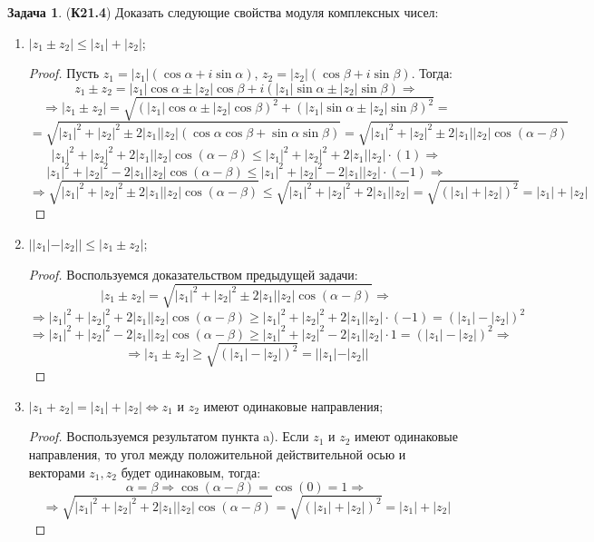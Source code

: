 \documentclass[12pt]{article}
\theoremstyle{definition}
\newtheorem{problem}{Задача}
\begin{document}
\begin{problem}(\textbf{К21.4}) Доказать следующие свойства модуля комплексных чисел:
	\begin{enumerate}[label=\asbuk*)]
		\item $|z_1 \pm z_2| \leq |z_1| + |z_2|$;
		\begin{proof}
			Пусть $z_1 = |z_1|(\cos\alpha + i \sin\alpha)$, $z_2 = |z_2|(\cos\beta + i \sin \beta)$. Тогда:
			$$
				z_1 \pm z_2 = |z_1|\cos\alpha \pm |z_2|\cos\beta + i(|z_1|\sin\alpha \pm |z_2|\sin\beta) \Rightarrow
			$$
			$$
				\Rightarrow |z_1 \pm z_2| = \sqrt{(|z_1|\cos\alpha \pm |z_2|\cos\beta)^2 + (|z_1|\sin\alpha \pm |z_2|\sin\beta)^2} = 
			$$
			$$
				=	\sqrt{|z_1|^2 + |z_2|^2 \pm 2|z_1||z_2|(\cos\alpha\cos\beta + \sin\alpha\sin\beta) } = \sqrt{|z_1|^2 + |z_2|^2 \pm 2|z_1||z_2|\cos(\alpha - \beta)}
			$$
			$$
				|z_1|^2 + |z_2|^2 + 2|z_1||z_2|\cos(\alpha - \beta) \leq  |z_1|^2 + |z_2|^2 + 2|z_1||z_2|{\cdot}(1) \Rightarrow 
			$$
			$$
				|z_1|^2 + |z_2|^2 - 2|z_1||z_2|\cos(\alpha - \beta) \leq  |z_1|^2 + |z_2|^2 - 2|z_1||z_2|{\cdot}(-1) \Rightarrow
			$$
			$$
				\Rightarrow \sqrt{|z_1|^2 + |z_2|^2 \pm 2|z_1||z_2|\cos(\alpha - \beta)} \leq \sqrt{|z_1|^2 + |z_2|^2 + 2|z_1||z_2|} = \sqrt{(|z_1| + |z_2|)^2} = |z_1| + |z_2|
			$$
		\end{proof}
		\item $||z_1| - |z_2|| \leq |z_1 \pm z_2|$;
		\begin{proof}
			Воспользуемся доказательством предыдущей задачи:
			$$
				|z_1 \pm z_2| = \sqrt{|z_1|^2 + |z_2|^2 \pm 2|z_1||z_2|\cos(\alpha - \beta)} \Rightarrow
			$$
			$$
				\Rightarrow |z_1|^2 + |z_2|^2 + 2|z_1||z_2|\cos(\alpha - \beta) \geq  |z_1|^2 + |z_2|^2 + 2|z_1||z_2|{\cdot}(-1) = (|z_1| - |z_2|)^2
			$$
			$$
				\Rightarrow |z_1|^2 + |z_2|^2 - 2|z_1||z_2|\cos(\alpha - \beta) \geq  |z_1|^2 + |z_2|^2 - 2|z_1||z_2|{\cdot}1 = (|z_1| - |z_2|)^2 \Rightarrow
			$$
			$$
				\Rightarrow |z_1 \pm z_2| \geq \sqrt{(|z_1| - |z_2|)^2} = ||z_1| - |z_2||
			$$
		\end{proof}
		\item $|z_1 + z_2| = |z_1| + |z_2| \Leftrightarrow z_1$ и $z_2$ имеют одинаковые направления;
		\begin{proof}
			Воспользуемся результатом пункта a). Если $z_1$ и $z_2$ имеют одинаковые направления, то угол между положительной действительной осью и векторами $z_1,z_2$ будет одинаковым, тогда:
			$$
				\alpha = \beta \Rightarrow \cos(\alpha - \beta) = \cos(0) = 1 \Rightarrow 
			$$
			$$
				\Rightarrow \sqrt{|z_1|^2 + |z_2|^2 + 2|z_1||z_2|\cos(\alpha - \beta)} = \sqrt{(|z_1| + |z_2|)^2} = |z_1| + |z_2|
$$
\end{proof}
\end{enumerate}
\end{problem}
\end{document}
